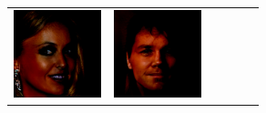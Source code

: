 \documentclass{article}
\newcommand{\pganw}{1.0in}
\begin{document}
\begin{table}[htbp]
\begin{center}
\begin{tabular}{cc|cc|cc}
\includegraphics[width=\pganw]{figures/pgan/2_base_iso_MH.png} &
\includegraphics[width=\pganw]{figures/pgan/3_base_iso_MH.png} \\

\end{tabular}
\end{center}
\end{table}
\end{document}
